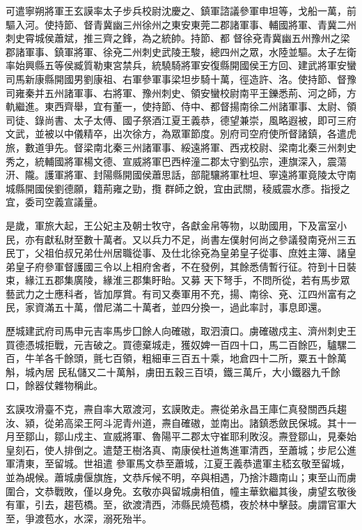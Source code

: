\begin{pinyinscope}
 可遣寧朔將軍王玄謨率太子步兵校尉沈慶之、鎮軍諮議參軍申坦等，戈船一萬，前驅入河。使持節、督青冀幽三州徐州之東安東莞二郡諸軍事、輔國將軍、青冀二州刺史霄城侯蕭斌，推三齊之鋒，為之統帥。持節、都
 督徐兗青冀幽五州豫州之梁郡諸軍事、鎮軍將軍、徐兗二州刺史武陵王駿，總四州之眾，水陸並驅。太子左衛率始興縣五等侯臧質勒東宮禁兵，統驍騎將軍安復縣開國侯王方回、建武將軍安蠻司馬新康縣開國男劉康祖、右軍參軍事梁坦步騎十萬，徑造許、洛。使持節、督豫司雍秦并五州諸軍事、右將軍、豫州刺史、領安蠻校尉南平王鑠悉荊、河之師，方軌繼進。東西齊舉，宜有董一，使持節、侍中、都督揚南徐二州諸軍事、太尉、領
 司徒、錄尚書、太子太傅、國子祭酒江夏王義恭，德望兼崇，風略遐被，即可三府文武，並被以中儀精卒，出次徐方，為眾軍節度。別府司空府使所督諸鎮，各遣虎旅，數道爭先。督梁南北秦三州諸軍事、綏遠將軍、西戎校尉、梁南北秦三州刺史秀之，統輔國將軍楊文德、宣威將軍巴西梓潼二郡太守劉弘宗，連旗深入，震蕩汧、隴。護軍將軍、封陽縣開國侯蕭思話，部龍驤將軍杜坦、寧遠將軍竟陵太守南城縣開國侯劉德願，籍荊雍之勁，攬
 群師之銳，宜由武關，稜威震水彥。指授之宜，委司空義宣議量。



 是歲，軍旅大起，王公妃主及朝士牧守，各獻金帛等物，以助國用，下及富室小民，亦有獻私財至數十萬者。又以兵力不足，尚書左僕射何尚之參議發南兗州三五民丁，父祖伯叔兄弟仕州居職從事、及仕北徐兗為皇弟皇子從事、庶姓主簿、諸皇弟皇子府參軍督護國三令以上相府舍者，不在發例，其餘悉倩暫行征。符到十日裝束，緣江五郡集廣陵，緣淮三郡集盱眙。又募
 天下弩手，不問所從，若有馬步眾藝武力之士應科者，皆加厚賞。有司又奏軍用不充，揚、南徐、兗、江四州富有之民，家資滿五十萬，僧尼滿二十萬者，並四分換一，過此率討，事息即還。



 歷城建武府司馬申元吉率馬步囗餘人向確磝，取泗瀆口。虜確磝戍主、濟州刺史王買德憑城拒戰，元吉破之。買德棄城走，獲奴婢一百四十口，馬二百餘匹，驢騾二百，牛羊各千餘頭，氈七百領，粗細車三百五十乘，地倉四十二所，粟五十餘萬斛，城內居
 民私儲又二十萬斛，虜田五穀三百頃，鐵三萬斤，大小鐵器九千餘口，餘器仗雜物稱此。



 玄謨攻滑臺不克，燾自率大眾渡河，玄謨敗走。燾從弟永昌王庫仁真發關西兵趨汝、潁，從弟高梁王阿斗泥青州道，燾自確磝，並南出。諸鎮悉斂民保城。其十一月至鄒山，鄒山戍主、宣威將軍、魯陽平二郡太守崔耶利敗沒。燾登鄒山，見秦始皇刻石，使人排倒之。遣楚王樹洛真、南康侯杜道雋進軍清西，至蕭城；步尼公進軍清東，至留城。世祖遣
 參軍馬文恭至蕭城，江夏王義恭遣軍主嵇玄敬至留城，並為覘候。蕭城虜偃旗旌，文恭斥候不明，卒與相遇，乃捨汴趣南山；東至山而虜圍合，文恭戰敗，僅以身免。玄敬亦與留城虜相值，幢主華欽繼其後，虜望玄敬後有軍，引去，趨苞橋。至，欲渡清西，沛縣民燒苞橋，夜於林中擊鼓。虜謂官軍大至，爭渡苞水，水深，溺死殆半。




\end{pinyinscope}
